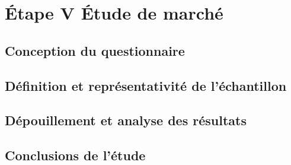 \section{Étape V \textendash{} Étude de marché}

\subsection{Conception du questionnaire}

\subsection{Définition et représentativité de l'échantillon}

\subsection{Dépouillement et analyse des résultats}

\subsection{Conclusions de l'étude}
